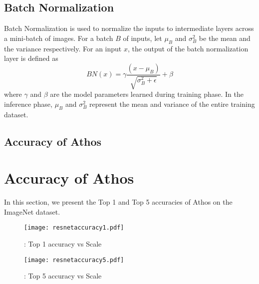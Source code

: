 \subsection{Batch Normalization}\label{appendix:batchnorm}
Batch Normalization \cite{batchNormPaper} is used to normalize the inputs to intermediate layers across a mini-batch of images. 
For a batch $B$ of inputs, let $\mu_B$ and $\sigma_B^2$ be the mean and the variance respectively. 
For an input $x$, the output of the batch normalization layer is defined as
\[ BN(x) = \gamma\frac{\left( x - \mu_B \right)}{\sqrt{\sigma_B^2 + \epsilon}} + \beta \]
where $\gamma$ and $\beta$ are the model parameters learned during training phase. In the inference phase, $\mu_B$ and $\sigma_B^2$ represent the mean and variance of the entire training dataset.

\subsection{Accuracy of Athos}\label{appendix:accuracies}

\section{Accuracy of Athos}\label{appendix:accuracies}

In this section, we present the Top 1 and Top 5 accuracies of Athos on the ImageNet dataset. 

\begin{figure}
  \texttt{[image: resnetaccuracy1.pdf]}
  \caption{\resnet: Top 1 accuracy vs Scale}
  \label{fig:resnetaccuracy1}
\end{figure}

\begin{figure}
  \texttt{[image: resnetaccuracy5.pdf]}
  \caption{\resnet: Top 5 accuracy vs Scale}
  \label{fig:resnetaccuracy5}
\end{figure}




